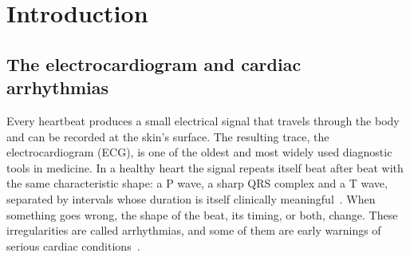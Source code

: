 \documentclass[a4paper, 12pt]{article}
\begin{document}
%

\newpage
\tableofcontents

\newpage
\section{Introduction} \label{sec:introduction}


\subsection{The electrocardiogram and cardiac arrhythmias} \label{subsec:ecg}

Every heartbeat produces a small electrical signal that travels through the body and can be
recorded at the skin's surface. The resulting trace, the electrocardiogram (ECG), is one of
the oldest and most widely used diagnostic tools in medicine. In a healthy heart the signal
repeats itself beat after beat with the same characteristic shape: a P wave, a sharp QRS
complex and a T wave, separated by intervals whose duration is itself clinically
meaningful~\cite{taskforce1996hrv}. When something goes wrong, the shape of the beat, its
timing, or both, change. These irregularities are called arrhythmias, and some of them are
early warnings of serious cardiac conditions~\cite{luz2016survey}.
\end{document}
